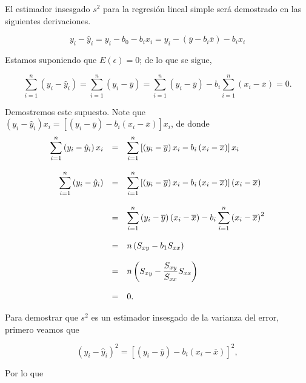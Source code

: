 El estimador insesgado $s^2$ para la regresión lineal simple será  demostrado en las siguientes derivaciones.

$$y_i-\hat{y}_i=y_i-b_0-b_ix_i=y_i-(\overline{y}-b_i\overline{x})-b_ix_i$$

Estamos suponiendo que $E(\epsilon)=0$; de lo que se sigue,

$$\sum_{i=1}^n\left(y_i-\hat{y}_i\right)=\sum_{i=1}^n \left(y_i-\overline{y}\right)=\sum_{i=1}^n \left(y_i-\overline{y}\right)-b_i\sum_{i=1}^n\left(x_i-\overline{x}\right)=0.$$

Demostremos este supuesto. Note que $\left(y_i-\hat{y}_i\right)x_i=\left[\left(y_i-\overline{y}\right)-b_i\left(x_i-\overline{x}\right)\right]x_i$, de donde
$$
\begin{array}[t]{rcl}
    \displaystyle\sum_{i=1}^n\left(y_i-\hat{y}_i\right)x_i &=& \displaystyle\sum_{i=1}^n\left[\left(y_i-\overline{y}\right)x_i-b_i\left(x_i-\overline{x}\right)\right]x_i\\\\
    \displaystyle\sum_{i=1}^n\left(y_i-\hat{y}_i\right) &=& \displaystyle\sum_{i=1}^n\left[\left(y_i-\overline{y}\right)x_i-b_i\left(x_i-\overline{x}\right)\right]\left(x_i-\overline{x}\right)\\\\
							&=& \displaystyle\sum_{i=1}^n\left(y_i-\overline{y}\right)\left(x_i-\overline{x}\right)-b_i\sum_{i=1}^n\left(x_i-\overline{x}\right)^2\\\\
							&=& n\left(S_{xy}-b_1S_{xx}\right)\\\\
							&=&n\left(S_{xy}-\dfrac{S_{xy}}{S_{xx}}S_{xx}\right)\\\\
							&=& 0.
\end{array}
$$

Para demostrar que $s^2$ es un estimador insesgado de la varianza del error, primero veamos que

$$\left(y_i-\hat{y}_i\right)^2=\left[\left(y_i-\overline{y}\right)-b_i\left(x_i-\overline{x}\right)\right]^2,$$

Por lo que


